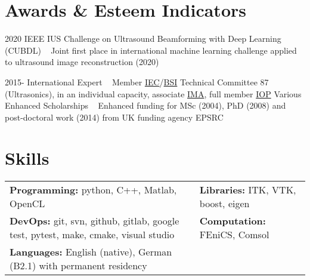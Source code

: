 \documentclass[english, print]{cv-style-wide}
\begin{document}
\section{Awards \& Esteem Indicators}
\vspace{-0.2cm}
\begin{entrylist}
\entry
{2020}
{IEEE IUS Challenge on Ultrasound Beamforming with Deep Learning (CUBDL)}
{~}
{Joint first place in international machine learning challenge applied to ultrasound image reconstruction (2020)}

\entry
{2015-}
{International Expert}
{~}
{Member \href{https://iec.ch/dyn/www/f?p=103:7:::::FSP_ORG_ID:1281}{IEC}/\href{https://standardsdevelopment.bsigroup.com/committees/50001534}{BSI} Technical Committee 87 (Ultrasonics), in an individual capacity, associate \href{https://ima.org.uk/}{IMA}, full member \href{https://www.iop.org/}{IOP}}
%
%
%
\entry
{Various}
{Enhanced Scholarships}
{~}
{Enhanced funding for MSc (2004), PhD (2008) and post-doctoral work (2014) from UK funding agency EPSRC}
\end{entrylist}


\section{Skills}
  \vspace{-0.2cm}
\begin{tabular}{p{} p{} }
\textbf{Programming:} python, C++, Matlab, OpenCL & \textbf{Libraries:} ITK, VTK, boost, eigen \\
%
\textbf{DevOps:} git, svn, github, gitlab, google test, pytest, make, cmake, visual studio & \textbf{Computation:} FEniCS, Comsol \\
%
%
 \textbf{Languages:} English (native), German (B2.1) with permanent residency  & {}
\end{tabular}
\end{document}
